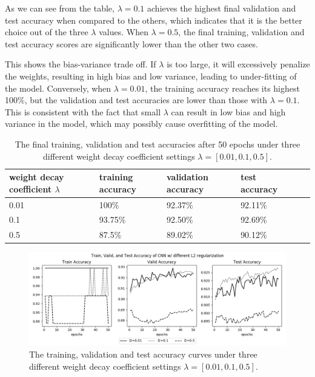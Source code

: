 \documentclass[12pt]{article}
\begin{document}
As we can see from the table, $\lambda = 0.1$ achieves the highest final validation and test accuracy when compared to the others, which indicates that it is the better choice out of the three $\lambda$ values. When  $\lambda=0.5$, the final training, validation and test accuracy scores are significantly lower than the other two cases. 

This shows the bias-variance trade off.
If $\lambda$ is too large, it will excessively penalize the weights, resulting in high bias and low variance, leading to under-fitting of the model. Conversely, when $\lambda = 0.01$, the training accuracy reaches its highest 100\%, but the validation and test accuracies are lower than those with $\lambda=0.1$. This is consistent with the fact that small $\lambda$ can result in low bias and high variance in the model, which may possibly cause overfitting of the model.


\begin{table}[!htb]
\center
\begin{tabular}{|l|l|l|l|l|l|}
\hline
weight decay coefficient $\lambda$ & training accuracy & validation accuracy   & test accuracy     \\ \hline
0.01   & 100\%  & 92.37\% & 92.11\%  \\ \hline
0.1    &93.75\%  & 92.50\% & 92.69\%  \\ \hline
0.5    & 87.5\%  & 89.02\% & 90.12\%  \\ \hline

\end{tabular}
\caption{The final training, validation and test accuracies after 50 epochs under three different weight decay coefficient settings $\lambda=[0.01, 0.1, 0.5]$.}
\label{tab:2-3-1}
\end{table}





\begin{figure}[!htb]
\hspace*{-2cm}
\includegraphics[width=1.2\linewidth]{images/a2/2.3-1/accuracy.png}
\caption{The training, validation and test accuracy curves under three different weight decay coefficient settings $\lambda=[0.01, 0.1, 0.5]$.}\label{fig:2-3-1}
\end{figure}
\end{document}
